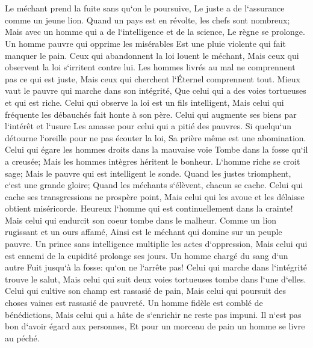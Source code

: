 \chapter{}

\verse Le méchant prend la fuite sans qu`on le poursuive, Le juste a de l`assurance comme un jeune lion. 
\verse Quand un pays est en révolte, les chefs sont nombreux; Mais avec un homme qui a de l`intelligence et de la science, Le règne se prolonge. 
\verse Un homme pauvre qui opprime les misérables Est une pluie violente qui fait manquer le pain. 
\verse Ceux qui abandonnent la loi louent le méchant, Mais ceux qui observent la loi s`irritent contre lui. 
\verse Les hommes livrés au mal ne comprennent pas ce qui est juste, Mais ceux qui cherchent l`Éternel comprennent tout. 
\verse Mieux vaut le pauvre qui marche dans son intégrité, Que celui qui a des voies tortueuses et qui est riche. 
\verse Celui qui observe la loi est un fils intelligent, Mais celui qui fréquente les débauchés fait honte à son père. 
\verse Celui qui augmente ses biens par l`intérêt et l`usure Les amasse pour celui qui a pitié des pauvres. 
\verse Si quelqu`un détourne l`oreille pour ne pas écouter la loi, Sa prière même est une abomination. 
\verse Celui qui égare les hommes droits dans la mauvaise voie Tombe dans la fosse qu`il a creusée; Mais les hommes intègres héritent le bonheur. 
\verse L`homme riche se croit sage; Mais le pauvre qui est intelligent le sonde. 
\verse Quand les justes triomphent, c`est une grande gloire; Quand les méchants s`élèvent, chacun se cache. 
\verse Celui qui cache ses transgressions ne prospère point, Mais celui qui les avoue et les délaisse obtient miséricorde. 
\verse Heureux l`homme qui est continuellement dans la crainte! Mais celui qui endurcit son coeur tombe dans le malheur. 
\verse Comme un lion rugissant et un ours affamé, Ainsi est le méchant qui domine sur un peuple pauvre. 
\verse Un prince sans intelligence multiplie les actes d`oppression, Mais celui qui est ennemi de la cupidité prolonge ses jours. 
\verse Un homme chargé du sang d`un autre Fuit jusqu`à la fosse: qu`on ne l`arrête pas! 
\verse Celui qui marche dans l`intégrité trouve le salut, Mais celui qui suit deux voies tortueuses tombe dans l`une d`elles. 
\verse Celui qui cultive son champ est rassasié de pain, Mais celui qui poursuit des choses vaines est rassasié de pauvreté. 
\verse Un homme fidèle est comblé de bénédictions, Mais celui qui a hâte de s`enrichir ne reste pas impuni. 
\verse Il n`est pas bon d`avoir égard aux personnes, Et pour un morceau de pain un homme se livre au péché. 
